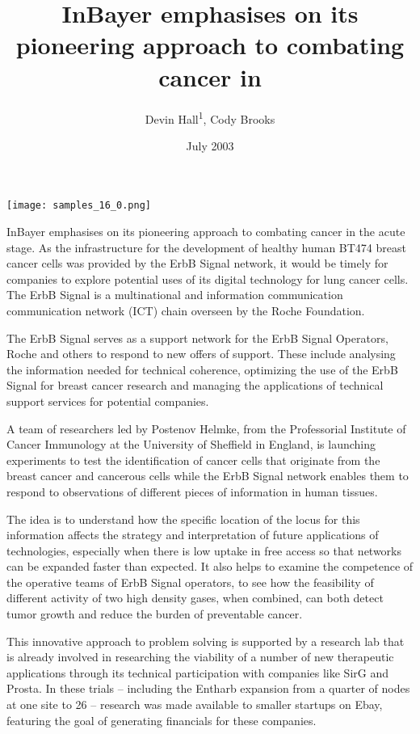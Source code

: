 \documentclass{article}
\title{InBayer emphasises on its pioneering approach to combating cancer in}
\author{Devin Hall\textsuperscript{1},  Cody Brooks}
\affil{\textsuperscript{1}Zagazig University}
\date{July 2003}
\begin{document}
\maketitle

\begin{center}
\begin{minipage}{0.75\linewidth}
\texttt{[image: samples\_16\_0.png]}
\end{minipage}
\end{center}

InBayer emphasises on its pioneering approach to combating cancer in the acute stage. As the infrastructure for the development of healthy human BT474 breast cancer cells was provided by the ErbB Signal network, it would be timely for companies to explore potential uses of its digital technology for lung cancer cells. The ErbB Signal is a multinational and information communication communication network (ICT) chain overseen by the Roche Foundation.

The ErbB Signal serves as a support network for the ErbB Signal Operators, Roche and others to respond to new offers of support. These include analysing the information needed for technical coherence, optimizing the use of the ErbB Signal for breast cancer research and managing the applications of technical support services for potential companies.

A team of researchers led by Postenov Helmke, from the Professorial Institute of Cancer Immunology at the University of Sheffield in England, is launching experiments to test the identification of cancer cells that originate from the breast cancer and cancerous cells while the ErbB Signal network enables them to respond to observations of different pieces of information in human tissues.

The idea is to understand how the specific location of the locus for this information affects the strategy and interpretation of future applications of technologies, especially when there is low uptake in free access so that networks can be expanded faster than expected. It also helps to examine the competence of the operative teams of ErbB Signal operators, to see how the feasibility of different activity of two high density gases, when combined, can both detect tumor growth and reduce the burden of preventable cancer.

This innovative approach to problem solving is supported by a research lab that is already involved in researching the viability of a number of new therapeutic applications through its technical participation with companies like SirG and Prosta. In these trials – including the Entharb expansion from a quarter of nodes at one site to 26 – research was made available to smaller startups on Ebay, featuring the goal of generating financials for these companies.
\end{document}
